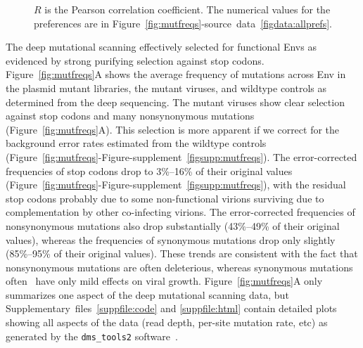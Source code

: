 \documentclass[9pt]{elife}
\begin{document}
\begin{figure}
{$R$ is the Pearson correlation coefficient. 
The numerical values for the preferences are in Figure~\ref{fig:mutfreqs}-source~data~\ref{figdata:allprefs}.
}
{}
\end{figure}

The deep mutational scanning effectively selected for functional Envs as evidenced by strong purifying selection against stop codons.
Figure~\ref{fig:mutfreqs}A shows the average frequency of mutations across Env in the plasmid mutant libraries, the mutant viruses, and wildtype controls as determined from the deep sequencing.
The mutant viruses show clear selection against stop codons and many nonsynonymous mutations (Figure~\ref{fig:mutfreqs}A).
This selection is more apparent if we correct for the background error rates estimated from the wildtype controls (Figure~\ref{fig:mutfreqs}-Figure-supplement~\ref{figsupp:mutfreqs}).
The error-corrected frequencies of stop codons drop to 3\%--16\% of their original values (Figure~\ref{fig:mutfreqs}-Figure-supplement~\ref{figsupp:mutfreqs}), with the residual stop codons probably due to some non-functional virions surviving due to complementation by other co-infecting virions. 
The error-corrected frequencies of nonsynonymous mutations also drop substantially (43\%--49\% of their original values), whereas the frequencies of synonymous mutations drop only slightly (85\%--95\% of their original values).
These trends are consistent with the fact that nonsynonymous mutations are often deleterious, whereas synonymous mutations often~\citep[although certainly not always, see][]{zanini2013quantifying} have only mild effects on viral growth.
Figure~\ref{fig:mutfreqs}A only summarizes one aspect of the deep mutational scanning data, but Supplementary~files~\ref{suppfile:code} and \ref{suppfile:html} contain detailed plots showing all aspects of the data (read depth, per-site mutation rate, etc) as generated by the \texttt{dms\_tools2} software~\citep[\url{https://jbloomlab.github.io/dms_tools2/}]{bloom2015software}.
\end{document}
